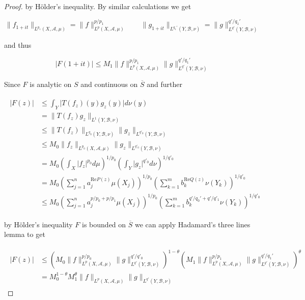 \begin{proof}
				by H\"older's inequality. By similar calculations we get 
				
				\begin{equation}
					\|f_{1 + it}\|_{L^{p_1}(X,\mathcal{A},\mu)} = \|f\|_{L^p(X,\mathcal{A},\mu)}^{p/p_1} \qquad \|g_{1 + it}\|_{L^{q_1'}(Y,\mathcal{B},\nu)} = \|g\|_{L^{q'}(Y,\mathcal{B},\nu)}^{q'/q_1'}
				\end{equation}

				and thus 
				
				\begin{equation}
					\vert F(1 + it)\vert \leqslant M_1 \|f\|_{L^p(X,\mathcal{A},\mu)}^{p/p_1}\|g\|_{L^{q'}(Y,\mathcal{B},\nu)}^{q'/q_1'}
				\end{equation}	

					Since $F$ is analytic on $S$ and continuous on $\overline{S}$ and further 
		
		\begin{gather}
			\begin{aligned}
				\vert F(z)\vert &\leqslant \int_Y\vert T(f_z)(y)g_z(y)\vert d\nu(y)\\
				&= \|T(f_z)g_z\|_{L^1(Y,\mathcal{B},\nu)}\\
				&\leqslant \|T(f_z)\|_{L^{q_0}(Y,\mathcal{B},\nu)} \|g_z\|_{L^{q'_0}(Y,\mathcal{B},\nu)}\\
				&\leqslant M_0 \|f_z\|_{L^{p_0}(X,\mathcal{A},\mu)} \|g_z\|_{L^{q'_0}(Y,\mathcal{B},\nu)}\\
				&= M_0 \left(\int_X \vert f_z \vert^{p_0} d\mu\right)^{1/p_0} \left(\int_Y \vert g_z \vert^{q'_0} d\nu\right)^{1/q'_0}\\
				&= M_0 \left( \sum\limits_{j = 1}^n a_j^{\mathrm{Re}P(z)}\mu(X_j) \right)^{1/p_0} \left( \sum\limits_{k = 1}^m b_k^{\mathrm{Re}Q(z)} \nu(Y_k) \right)^{1/q'_0}\\
				&\leqslant M_0 \left( \sum\limits_{j = 1}^n a_j^{p/p_0 + p/p_1}\mu(X_j) \right)^{1/p_0} \left( \sum\limits_{k = 1}^m b_k^{q'/q_0' + q'/q'_1} \nu(Y_k) \right)^{1/q'_0}
			\end{aligned}
		\end{gather}
		
		
		by H\"older's inequality $F$ is bounded on $\overline{S}$ we can apply Hadamard's three lines lemma to get

		\begin{gather}
			\begin{aligned}
			\vert F(z) \vert &\leqslant \left( M_0  \|f\|_{L^p(X,\mathcal{A},\mu)}^{p/p_0} \|g\|_{L^{q'}(Y,\mathcal{B},\nu)}^{q'/q'_0} \right)^{1 - \theta}\left(  M_1 \|f\|_{L^p(X,\mathcal{A},\mu)}^{p/p_1}\|g\|_{L^{q'}(Y,\mathcal{B},\nu)}^{q'/q_1'} \right)^\theta\\
			&= M_0^{1 - \theta}M_1^\theta \|f\|_{L^p(X,\mathcal{A},\mu)}\|g\|_{L^{q'}(Y,\mathcal{B},\nu)}
			\label{est:F}
		\end{aligned}
		\end{gather}


\end{proof}
